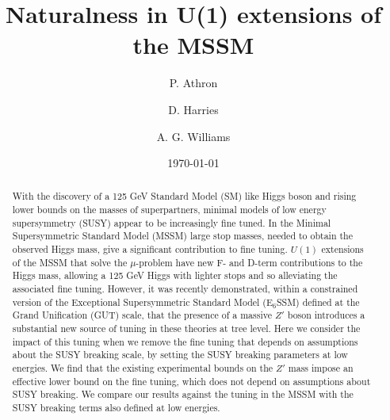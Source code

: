 \documentclass[preprint,amsmath,amssymb,aps,superscriptaddress,prd,showpacs,floatfix]{revtex4-1}
\begin{document}
\title{Naturalness in U(1) extensions of the MSSM}

\author{P. Athron}

\author{D. Harries}

\author{A. G. Williams}

\date{\today}%

\begin{abstract}
With the discovery of a 125 GeV Standard Model (SM) like Higgs boson
and rising lower bounds on the masses of superpartners, minimal models
of low energy supersymmetry (SUSY) appear to be increasingly fine
tuned. In the Minimal Supersymmetric Standard Model (MSSM) large stop
masses, needed to obtain the observed Higgs mass, give a significant
contribution to fine tuning. $U(1)$ extensions of the MSSM that solve
the $\mu$-problem have new F- and D-term contributions to the Higgs mass,
allowing a 125 GeV Higgs with lighter stops and so alleviating the
associated fine tuning. However, it was recently demonstrated, within
a constrained version of the Exceptional Supersymmetric Standard Model (E$_6$SSM)
defined at the Grand Unification (GUT) scale, that the presence of a massive $Z'$ boson introduces a 
substantial new source of tuning in these theories at tree level. Here we
consider the impact of this tuning when we remove the fine tuning that depends
on assumptions about the SUSY breaking scale, by setting the SUSY
breaking parameters at low energies. We find that the existing
experimental bounds on the $Z'$ mass impose an effective lower bound on
the fine tuning, which does not depend on assumptions about SUSY breaking. 
We compare our results against the tuning in the MSSM with the SUSY breaking terms also defined at low energies.

\end{abstract}
\end{document}
